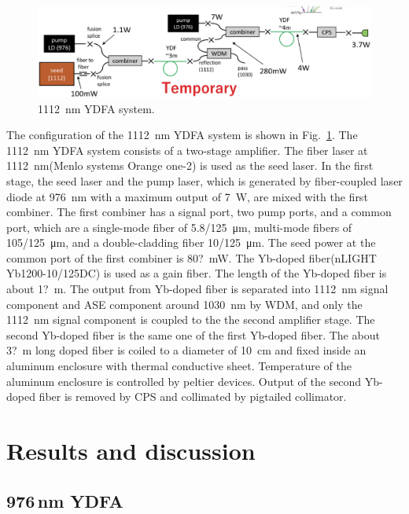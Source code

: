 \documentclass{osa-article}
\begin{document}
\begin{figure}[h!]
  \centering\includegraphics[width=\linewidth]{./Figure/1112nmYDFASystem_Temp.eps}
  \caption{\SI{1112}{\nm} YDFA system.}
  \label{fig:1112YDFASystem}
\end{figure}

The configuration of the \SI{1112}{\nm} YDFA system is shown in Fig.~\ref{fig:1112YDFASystem}.
The \SI{1112}{\nm} YDFA system consists of a two-stage amplifier.
The fiber laser at \SI{1112}{\nm}(Menlo systems Orange one-2) is used as the seed laser.
In the first stage, the seed laser and the pump laser, which is generated by fiber-coupled laser diode at \SI{976}{\nm} with a maximum output of \SI{7}{\W}, are mixed with the first combiner.
The first combiner has a signal port, two pump ports, and a common port, which are a single-mode fiber of \SI{5.8/125}{\um}, multi-mode fibers of \SI{105/125}{\um}, and a double-cladding fiber \SI{10/125}{\um}.
The seed power at the common port of the first combiner is \SI{80?}{\mW}.
The Yb-doped fiber(nLIGHT Yb1200-10/125DC) is used as a gain fiber.
The length of the Yb-doped fiber is about \SI{1?}{m}.
The output from Yb-doped fiber is separated into \SI{1112}{\nm} signal component and ASE component around \SI{1030}{\nm} by WDM, and only the \SI{1112}{\nm} signal component is coupled to the the second amplifier stage.
The second Yb-doped fiber is the same one of the first Yb-doped fiber.
The about \SI{3?}{m} long doped fiber is coiled to a diameter of \SI{10}{\cm} and fixed inside an aluminum enclosure with thermal conductive sheet.
Temperature of the aluminum enclosure is controlled by peltier devices.
Output of the second Yb-doped fiber is removed by CPS and collimated by pigtailed collimator.


\section{Results and discussion}
\subsection{976\,nm YDFA}
\end{document}
